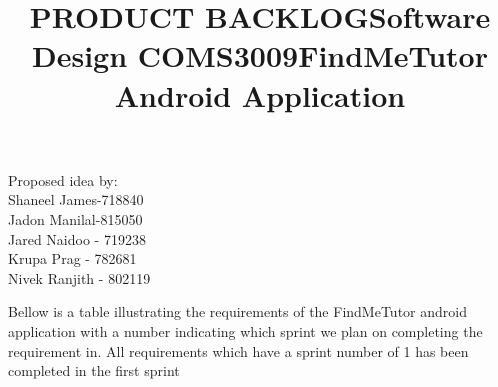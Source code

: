\documentclass[12pt]{article}
\begin{document}
\title{\textbf{PRODUCT BACKLOG}}
\maketitle
\begin{center}
\title{\textbf{Software Design COMS3009}}
\maketitle 

\title{\textbf{FindMeTutor Android Application}}
\maketitle 
\end{center}


\begin{center}
Proposed idea by:\\
Shaneel James-718840
\\Jadon Manilal-815050
\\Jared Naidoo - 719238
\\Krupa Prag - 782681
\\Nivek Ranjith - 802119
\end{center}

\newpage






\tableofcontents
\newpage
\begin{flushleft}

Bellow is a table illustrating the requirements of the FindMeTutor android application with a number indicating which sprint we plan on completing the requirement in. All requirements which have a sprint number of 1 has been completed in the first sprint\\
\end{flushleft}
\end{document}
